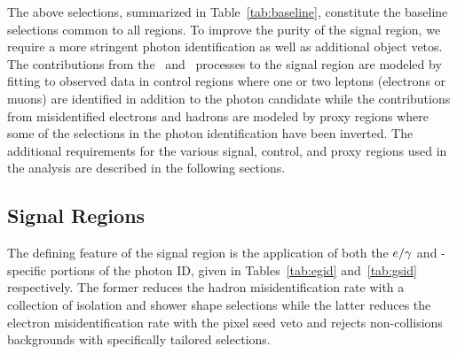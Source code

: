 \begin{table}[htbp]
  \centering
  \caption{Baseline selections for all events considered in the analysis.}
  \label{tab:baseline}
\end{table}

The above selections, summarized in Table~\ref{tab:baseline}, constitute the baseline selections common to all regions.
To improve the purity of the signal region, we require a more stringent photon identification as well as additional object vetos.
The contributions from the \zinvg\ and \wlng\ processes to the signal region are modeled by fitting to observed data in control regions where one or two leptons (electrons or muons) are identified in addition to the photon candidate while the contributions from misidentified electrons and hadrons are modeled by proxy regions where some of the selections in the photon identification have been inverted.
The additional requirements for the various signal, control, and proxy regions used in the analysis are described in the following sections.

\subsection{Signal Regions}
\label{sec:signal_regions}

The defining feature of the signal region is the application of both the ${e}/\gamma$ and \Pgg-specific portions of the photon ID, given in Tables~\ref{tab:egid} and~\ref{tab:gsid} respectively.
The former reduces the hadron misidentification rate with a collection of isolation and shower shape selections while the latter reduces the electron misidentification rate with the pixel seed veto and rejects non-collisions backgrounds with specifically tailored selections.

